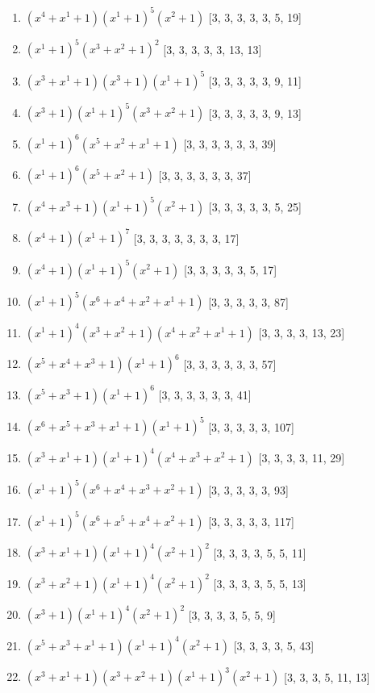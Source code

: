 \documentclass[10pt,twocolumn]{article}
\begin{document}
\begin{enumerate}
\item $(x^{4} + x^{1} + 1)(x^{1} + 1)^{5}(x^{2} + 1)$  [3, 3, 3, 3, 3, 5, 19]
\item $(x^{1} + 1)^{5}(x^{3} + x^{2} + 1)^{2}$  [3, 3, 3, 3, 3, 13, 13]
\item $(x^{3} + x^{1} + 1)(x^{3} + 1)(x^{1} + 1)^{5}$  [3, 3, 3, 3, 3, 9, 11]
\item $(x^{3} + 1)(x^{1} + 1)^{5}(x^{3} + x^{2} + 1)$  [3, 3, 3, 3, 3, 9, 13]
\item $(x^{1} + 1)^{6}(x^{5} + x^{2} + x^{1} + 1)$  [3, 3, 3, 3, 3, 3, 39]
\item $(x^{1} + 1)^{6}(x^{5} + x^{2} + 1)$  [3, 3, 3, 3, 3, 3, 37]
\item $(x^{4} + x^{3} + 1)(x^{1} + 1)^{5}(x^{2} + 1)$  [3, 3, 3, 3, 3, 5, 25]
\item $(x^{4} + 1)(x^{1} + 1)^{7}$  [3, 3, 3, 3, 3, 3, 3, 17]
\item $(x^{4} + 1)(x^{1} + 1)^{5}(x^{2} + 1)$  [3, 3, 3, 3, 3, 5, 17]
\item $(x^{1} + 1)^{5}(x^{6} + x^{4} + x^{2} + x^{1} + 1)$  [3, 3, 3, 3, 3, 87]
\item $(x^{1} + 1)^{4}(x^{3} + x^{2} + 1)(x^{4} + x^{2} + x^{1} + 1)$  [3, 3, 3, 3, 13, 23]
\item $(x^{5} + x^{4} + x^{3} + 1)(x^{1} + 1)^{6}$  [3, 3, 3, 3, 3, 3, 57]
\item $(x^{5} + x^{3} + 1)(x^{1} + 1)^{6}$  [3, 3, 3, 3, 3, 3, 41]
\item $(x^{6} + x^{5} + x^{3} + x^{1} + 1)(x^{1} + 1)^{5}$  [3, 3, 3, 3, 3, 107]
\item $(x^{3} + x^{1} + 1)(x^{1} + 1)^{4}(x^{4} + x^{3} + x^{2} + 1)$  [3, 3, 3, 3, 11, 29]
\item $(x^{1} + 1)^{5}(x^{6} + x^{4} + x^{3} + x^{2} + 1)$  [3, 3, 3, 3, 3, 93]
\item $(x^{1} + 1)^{5}(x^{6} + x^{5} + x^{4} + x^{2} + 1)$  [3, 3, 3, 3, 3, 117]
\item $(x^{3} + x^{1} + 1)(x^{1} + 1)^{4}(x^{2} + 1)^{2}$  [3, 3, 3, 3, 5, 5, 11]
\item $(x^{3} + x^{2} + 1)(x^{1} + 1)^{4}(x^{2} + 1)^{2}$  [3, 3, 3, 3, 5, 5, 13]
\item $(x^{3} + 1)(x^{1} + 1)^{4}(x^{2} + 1)^{2}$  [3, 3, 3, 3, 5, 5, 9]
\item $(x^{5} + x^{3} + x^{1} + 1)(x^{1} + 1)^{4}(x^{2} + 1)$  [3, 3, 3, 3, 5, 43]
\item $(x^{3} + x^{1} + 1)(x^{3} + x^{2} + 1)(x^{1} + 1)^{3}(x^{2} + 1)$  [3, 3, 3, 5, 11, 13]

\end{enumerate}
\end{document}
